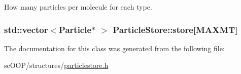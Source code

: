 How many particles per molecule for each type. 

\hypertarget{class_particle_store_a400507af548e0f0adcb216d96e515daa}{
\subsubsection[{store}]{\setlength{\rightskip}{0pt plus 5cm}std\+::vector$<${\bf Particle}$\ast$ $>$ Particle\+Store\+::store\mbox{[}{\bf M\+A\+X\+M\+T}\mbox{]}}}\label{class_particle_store_a400507af548e0f0adcb216d96e515daa}


The documentation for this class was generated from the following file\+:\begin{DoxyCompactItemize}
\item 
sc\+O\+O\+P/structures/\hyperlink{particlestore_8h}{particlestore.\+h}\end{DoxyCompactItemize}
